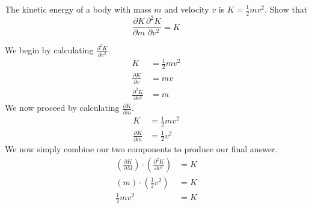 \begin{exercise}
	The kinetic energy of a body with mass $m$ and velocity $v$ is $K = \frac{1}{2}mv^2$. Show that
	\begin{equation*}
	\frac{\partial K}{\partial m} \frac{\partial^{2} K}{\partial v^2} = K
	\end{equation*}
\end{exercise}
\begin{solution}
	We begin by calculating $\frac{\partial^2 K}{\partial v^2}$.
	\begin{align*}
	K &= \frac{1}{2}mv^2 \\
	\frac{\partial K}{\partial v} &= mv \\
	\frac{\partial^2 K}{\partial v^2} &= m
	\end{align*}
	We now proceed by calculating $\frac{\partial K}{\partial m}$.
	\begin{align*}
	K &= \frac{1}{2}mv^2 \\
	\frac{\partial K}{\partial m} &= \frac{1}{2}v^2
	\end{align*}
	We now simply combine our two components to produce our final answer.
	\begin{align*}
	\left( \frac{\partial K}{\partial M} \right) \cdot \left( \frac{\partial^2 K}{\partial v^2} \right) &= K \\
	\left( m \right) \cdot \left( \frac{1}{2}v^2 \right) &= K \\
	\frac{1}{2}mv^2 &= K
	\end{align*}
\end{solution}
